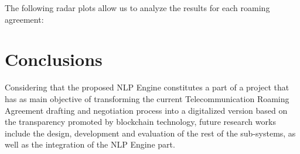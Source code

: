 \documentclass[conference]{style/IEEEtran}
\begin{document}
The following radar plots allow us to analyze the results for each roaming agreement:

\section{Conclusions}
Considering that the proposed NLP Engine constitutes a part of a project that has as main objective of transforming the current Telecommunication Roaming Agreement drafting and negotiation process into a digitalized version based on the transparency promoted by blockchain technology, future research works include the design, development and evaluation of the rest of the sub-systems, as well as the integration of the NLP Engine part. 

\printbibliography

\vspace{12pt}
\end{document}
